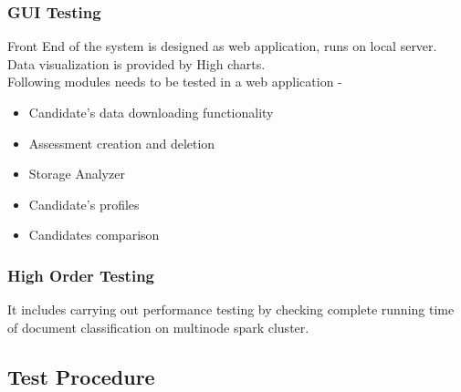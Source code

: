 \documentclass[oneside,a4paper,12pt]{pictreport}
\begin{document}
\subsubsection{GUI Testing}
Front End of the system is designed as web application, runs on local server. Data visualization is provided by High charts. \\
Following modules needs to be tested in a web application - 
\begin{itemize}
\item Candidate's data downloading functionality
\item Assessment creation and deletion
\item Storage Analyzer
\item Candidate's profiles
\item Candidates comparison 
\end{itemize}

\subsubsection{High Order Testing}
It includes carrying out performance testing by checking complete running time of document classification on multinode spark cluster.

\subsection{Test Procedure}
\end{document}
